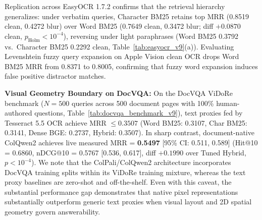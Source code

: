 Replication across EasyOCR 1.7.2 \cite{jaidedai2020easyocr} confirms that the retrieval hierarchy generalizes: under verbatim queries, Character BM25 retains top MRR (0.8519 clean, 0.4272 blur) over Word BM25 (0.7649 clean, 0.3472 blur; diff $+0.0870$ clean, $p_{\text{Holm}} < 10^{-4}$), reversing under light paraphrases (Word BM25 0.3792 vs.\ Character BM25 0.2292 clean, Table~\ref{tab:easyocr_v9}(a)). Evaluating Levenshtein fuzzy query expansion on Apple Vision clean OCR drops Word BM25 MRR from 0.8371 to 0.8005, confirming that fuzzy word expansion induces false positive distractor matches.

\textbf{Visual Geometry Boundary on DocVQA:} On the DocVQA ViDoRe benchmark ($N=500$ queries across 500 document pages with 100\% human-authored questions, Table~\ref{tab:docvqa_benchmark_v9}), text proxies fed by Tesseract 5.5 OCR achieve MRR $\le 0.3507$ (Word BM25: 0.3107, Char BM25: 0.3141, Dense BGE: 0.2737, Hybrid: 0.3507). In sharp contrast, document-native ColQwen2 \cite{faysse2024colqwen2} achieves live measured MRR = \textbf{0.5497} [95\% CI: 0.511, 0.589] (Hit@10 = 0.6860, nDCG@10 = 0.5767 [0.536, 0.617], diff $+0.1990$ over Tuned Hybrid, $p < 10^{-4}$). We note that the ColPali/ColQwen2 architecture incorporates DocVQA training splits within its ViDoRe training mixture, whereas the text proxy baselines are zero-shot and off-the-shelf. Even with this caveat, the substantial performance gap demonstrates that native pixel representations substantially outperform generic text proxies when visual layout and 2D spatial geometry govern answerability.

